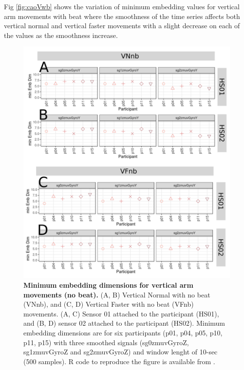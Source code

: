 Fig \ref{fig:caoVwb} shows the variation of minimum embedding values for 
vertical arm movements with beat where the smoothness of the time series
affects both vertical normal and vertical faster movements with a slight 
decrease on each of the values as the smoothness increase.
\begin{figure}[!h]
\centering
\includegraphics[width=1.0\textwidth]{cao_Vnb_w10}
	\caption{
	{\bf Minimum embedding dimensions for vertical arm movements 
	(no beat).} 
		(A, B) Vertical Normal with no beat (VNnb), and 
		(C, D) Vertical Faster with no beat (VFnb) movements.
		(A, C) Sensor 01 attached to the participant (HS01), and
		(B, D) sensor 02 attached to the participant (HS02).
		Minimum embedding dimensions are for six participants 
		(p01, p04, p05, p10, p11, p15) with three smoothed signals 
		(sg0zmuvGyroZ, sg1zmuvGyroZ and sg2zmuvGyroZ)
		and window lenght of 10-sec (500 samples).
		R code to reproduce the figure is available 
		from \cite{hwum2018}.
        }
    \label{fig:caoVnb}
\end{figure}

